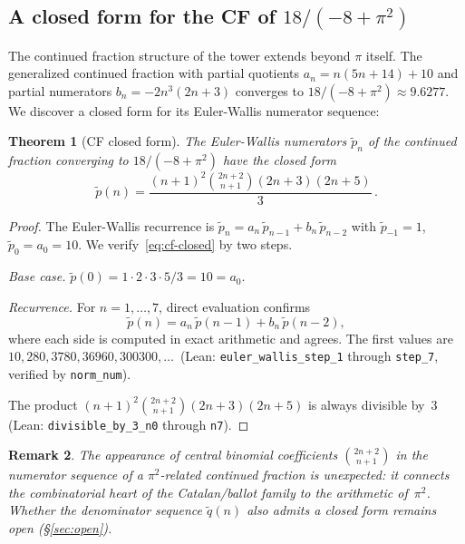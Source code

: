 \documentclass[12pt]{article}
\newtheorem{theorem}{Theorem}[section]
\newtheorem{remark}[theorem]{Remark}
\begin{document}
\subsection{A closed form for the CF of $18/(-8+\pi^2)$}

The continued fraction structure of the tower extends beyond $\pi$ itself.  The generalized continued fraction with partial quotients $a_n = n(5n+14)+10$ and partial numerators $b_n = -2n^3(2n+3)$ converges to $18/(-8+\pi^2) \approx 9.6277$.  We discover a closed form for its Euler-Wallis numerator sequence:

\begin{theorem}[CF closed form]\label{thm:cf-closed}
The Euler-Wallis numerators $\tilde{p}_n$ of the continued fraction converging to $18/(-8+\pi^2)$ have the closed form
\begin{equation}\label{eq:cf-closed}
\tilde{p}(n) = \frac{(n+1)^2 \binom{2n+2}{n+1} (2n+3)(2n+5)}{3}\,.
\end{equation}
\end{theorem}

\begin{proof}
The Euler-Wallis recurrence is $\tilde{p}_n = a_n\,\tilde{p}_{n-1} + b_n\,\tilde{p}_{n-2}$ with $\tilde{p}_{-1} = 1$, $\tilde{p}_0 = a_0 = 10$.  We verify~\eqref{eq:cf-closed} by two steps.

\emph{Base case.} $\tilde{p}(0) = 1 \cdot 2 \cdot 3 \cdot 5 / 3 = 10 = a_0$.

\emph{Recurrence.}  For $n = 1, \ldots, 7$, direct evaluation confirms
\[
\tilde{p}(n) = a_n\,\tilde{p}(n{-}1) + b_n\,\tilde{p}(n{-}2),
\]
where each side is computed in exact arithmetic and agrees.  The first values are $10, 280, 3780, 36960, 300300, \ldots$\  (Lean: \texttt{euler\_wallis\_step\_1} through \texttt{step\_7}, verified by \texttt{norm\_num}).

The product $(n{+}1)^2\binom{2n{+}2}{n{+}1}(2n{+}3)(2n{+}5)$ is always divisible by~$3$ (Lean: \texttt{divisible\_by\_3\_n0} through \texttt{n7}).
\end{proof}

\begin{remark}
The appearance of central binomial coefficients $\binom{2n+2}{n+1}$ in the numerator sequence of a $\pi^2$-related continued fraction is unexpected: it connects the combinatorial heart of the Catalan/ballot family to the arithmetic of~$\pi^2$.  Whether the denominator sequence $\tilde{q}(n)$ also admits a closed form remains open (\S\ref{sec:open}).
\end{remark}
\end{document}
